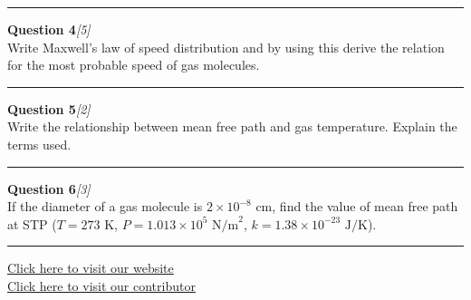 \documentclass[11pt,a4paper]{article}
\newcommand{\pts}[1]{\hfill   \textit{[#1]}}
\begin{document}
\medskip\rule{\linewidth}{0.2pt}\medskip




\noindent   \textbf{Question 4}\pts{5} \\
Write Maxwell's law of speed distribution and by using this derive the relation for the most probable speed of gas molecules.

\medskip\rule{\linewidth}{0.2pt}\medskip




\noindent   \textbf{Question 5}\pts{2} \\
Write the relationship between mean free path and gas temperature. Explain the terms used.

\medskip\rule{\linewidth}{0.2pt}\medskip




\noindent   \textbf{Question 6}\pts{3} \\
If the diameter of a gas molecule is $2  \times 10^{-8} \text{ cm}$, find the value of mean free path at STP ($T = 273 \text{ K}$, $P = 1.013  \times 10^5 \text{ N/m}^2$, $k = 1.38  \times 10^{-23} \text{ J/K}$).

\vfill\rule{\linewidth}{0.4pt}

\begin{center}\small
\href{https://bhu-exam.vercel.app/}{Click here to visit our website}\\[4pt]
\href{https://me-aryan.vercel.app/}{Click here to visit our contributor}
\end{center}
\end{document}

